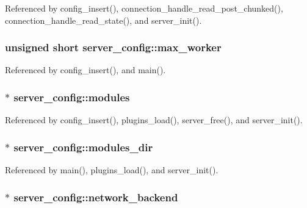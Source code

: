 Referenced by config\-\_\-insert(), connection\-\_\-handle\-\_\-read\-\_\-post\-\_\-chunked(), connection\-\_\-handle\-\_\-read\-\_\-state(), and server\-\_\-init().

\hypertarget{structserver__config_a7df2e6601a6df2dd8c6972add0a63e3f}{
\subsubsection[{max\-\_\-worker}]{\setlength{\rightskip}{0pt plus 5cm}unsigned short server\-\_\-config\-::max\-\_\-worker}}\label{structserver__config_a7df2e6601a6df2dd8c6972add0a63e3f}


Referenced by config\-\_\-insert(), and main().

\hypertarget{structserver__config_a950cd04ccccaeabb293df867d6c84c32}{
\subsubsection[{modules}]{$\ast$ server\-\_\-config\-::modules}}\label{structserver__config_a950cd04ccccaeabb293df867d6c84c32}


Referenced by config\-\_\-insert(), plugins\-\_\-load(), server\-\_\-free(), and server\-\_\-init().

\hypertarget{structserver__config_a06280142a08f0801a2ee4c77f1d43072}{
\subsubsection[{modules\-\_\-dir}]{$\ast$ server\-\_\-config\-::modules\-\_\-dir}}\label{structserver__config_a06280142a08f0801a2ee4c77f1d43072}


Referenced by main(), plugins\-\_\-load(), and server\-\_\-init().

\hypertarget{structserver__config_a2f7bb5d246577003946252d28b70cf81}{
\subsubsection[{network\-\_\-backend}]{$\ast$ server\-\_\-config\-::network\-\_\-backend}}\label{structserver__config_a2f7bb5d246577003946252d28b70cf81}


